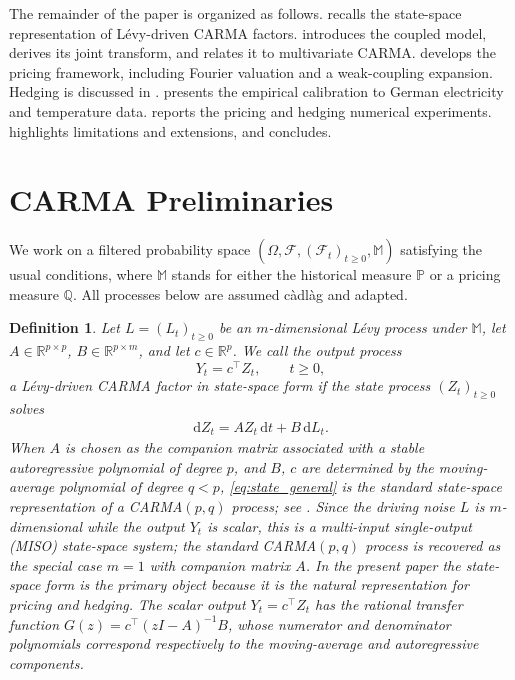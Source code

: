 \documentclass[10pt,reqno]{amsart}
\newtheorem{definition}[theorem]{Definition}
\newcommand{\R}{\mathbb{R}}
\newcommand{\Q}{\mathbb{Q}}
\newcommand{\PP}{\mathbb{P}}
\newcommand{\F}{\mathcal{F}}
\newcommand{\1}{\mathbbm{1}}
\newcommand{\dd}{\mathrm{d}}
\begin{document}
The remainder of the paper is organized as follows.
 recalls the state-space representation of
Lévy-driven CARMA factors.  introduces the
coupled model, derives its joint transform, and relates it to multivariate
CARMA.  develops the pricing framework,
including Fourier valuation and a weak-coupling expansion. Hedging is discussed
in .  presents the empirical
calibration to German electricity and temperature data. 
reports the pricing and hedging numerical experiments. 
highlights limitations and extensions, and  concludes.

\section{CARMA Preliminaries}\label{sec:carma-preliminaries}

We work on a filtered probability space
$(\Omega,\F,(\F_t)_{t \ge 0},\mathbb{M})$ satisfying the usual conditions,
where $\mathbb{M}$ stands for either the historical measure $\PP$ or a
pricing measure $\Q$. All processes below are assumed càdlàg and adapted.

\begin{definition}\label{def:carma-factor}
Let $L=(L_t)_{t \ge 0}$ be an $m$-dimensional Lévy process under
$\mathbb{M}$, let $A \in \R^{p \times p}$, $B \in \R^{p \times m}$, and
let $c \in \R^p$. We call the output process
$$
Y_t = c^\top Z_t,\qquad t \ge 0,
$$
a \emph{Lévy-driven CARMA factor in state-space form} if the state process
$(Z_t)_{t \ge 0}$ solves
\begin{align}\label{eq:state_general}
  \dd Z_t = A Z_t\,\dd t + B\,\dd L_t.
\end{align}
When $A$ is chosen as the companion matrix associated with a stable
autoregressive polynomial of degree $p$, and $B$, $c$ are determined by
the moving-average polynomial of degree $q < p$,
\eqref{eq:state_general} is the standard state-space
representation of a CARMA$(p,q)$ process; see \citet{Bro01}. Since the driving
noise $L$ is $m$-dimensional while the output $Y_t$ is scalar, this is a
\emph{multi-input single-output} (MISO) state-space system; the standard
CARMA$(p,q)$ process is recovered as the special case $m=1$ with companion
matrix $A$. In the present paper the state-space form is the primary object
because it is the natural representation for pricing and hedging. The scalar
output $Y_t = c^\top Z_t$ has the rational transfer function
$G(z) = c^\top(zI-A)^{-1}B$, whose numerator and denominator polynomials
correspond respectively to the moving-average and autoregressive components.
\end{definition}
\end{document}
